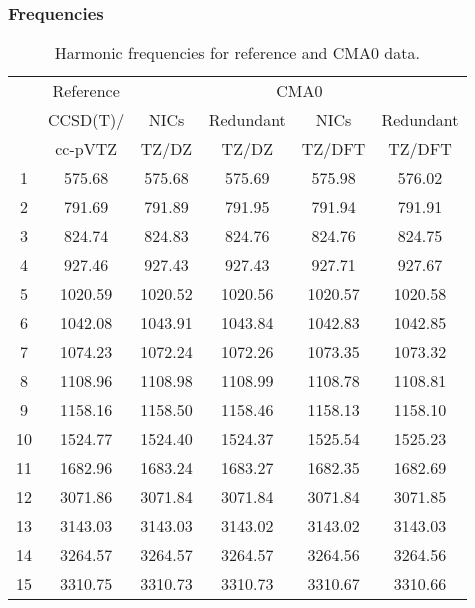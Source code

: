 \documentclass[10pt,oneside]{article}
\begin{document}
\begin{table}[h!]
\subsubsection*{Frequencies}
\centering
\caption{Harmonic frequencies for reference and CMA0 data.}
\begin{tabular}{cccccc}
\toprule
{} & Reference & \multicolumn{4}{c}{CMA0} \\
{} &  CCSD(T)/ &    NICs &  Redundant &    NICs & Redundant \\
{} &   cc-pVTZ &   TZ/DZ &      TZ/DZ &  TZ/DFT &    TZ/DFT \\
\midrule
1  &    575.68 &  575.68 &     575.69 &  575.98 &    576.02 \\
2  &    791.69 &  791.89 &     791.95 &  791.94 &    791.91 \\
3  &    824.74 &  824.83 &     824.76 &  824.76 &    824.75 \\
4  &    927.46 &  927.43 &     927.43 &  927.71 &    927.67 \\
5  &   1020.59 & 1020.52 &    1020.56 & 1020.57 &   1020.58 \\
6  &   1042.08 & 1043.91 &    1043.84 & 1042.83 &   1042.85 \\
7  &   1074.23 & 1072.24 &    1072.26 & 1073.35 &   1073.32 \\
8  &   1108.96 & 1108.98 &    1108.99 & 1108.78 &   1108.81 \\
9  &   1158.16 & 1158.50 &    1158.46 & 1158.13 &   1158.10 \\
10 &   1524.77 & 1524.40 &    1524.37 & 1525.54 &   1525.23 \\
11 &   1682.96 & 1683.24 &    1683.27 & 1682.35 &   1682.69 \\
12 &   3071.86 & 3071.84 &    3071.84 & 3071.84 &   3071.85 \\
13 &   3143.03 & 3143.03 &    3143.02 & 3143.02 &   3143.03 \\
14 &   3264.57 & 3264.57 &    3264.57 & 3264.56 &   3264.56 \\
15 &   3310.75 & 3310.73 &    3310.73 & 3310.67 &   3310.66 \\
\bottomrule
\end{tabular}
\end{table}
\end{document}
